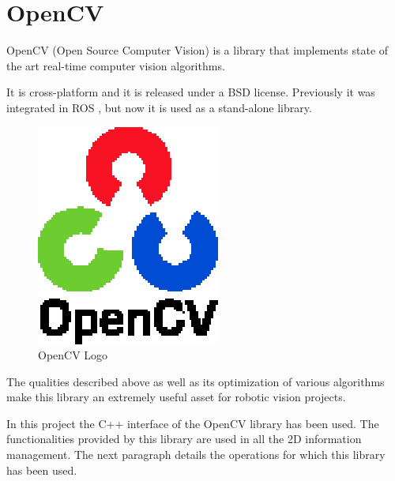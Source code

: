 \section{OpenCV}
\label{opencv}

OpenCV\cite{opencv} (Open Source Computer Vision) is a library that implements state of the art real-time computer vision 
algorithms. 

It is cross-platform and it is released under a BSD\cite{BSD} license. Previously it was integrated in ROS \cite{ros}, but
now it is used as a stand-alone library.  

\begin{figure}[h]
	\begin{center}
    \includegraphics[scale=1]{img/opencv/logo.eps}
	\caption[OpenCV Logo]{OpenCV Logo}
	\end{center}
\end{figure}

The qualities described above as well as its optimization of various algorithms make this library an extremely useful asset for robotic vision projects. 


In this project the C++ interface of the OpenCV library has been used. The functionalities provided by this library are used in all the 2D information management. The next paragraph details the operations for which this library has been used. 
